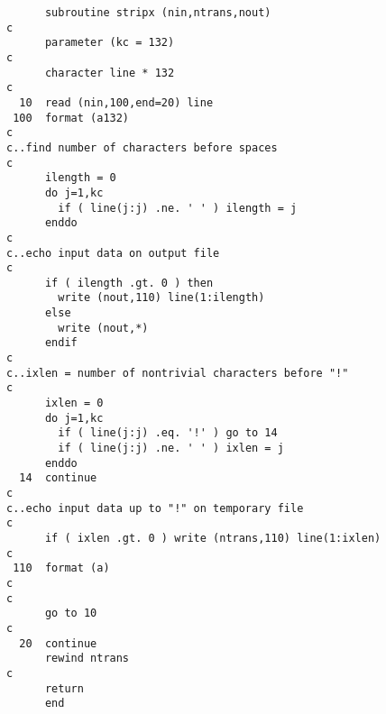 \begin{verbatim}
      subroutine stripx (nin,ntrans,nout)
c
      parameter (kc = 132)
c
      character line * 132
c
  10  read (nin,100,end=20) line
 100  format (a132)
c
c..find number of characters before spaces
c
      ilength = 0
      do j=1,kc
        if ( line(j:j) .ne. ' ' ) ilength = j
      enddo
c
c..echo input data on output file
c
      if ( ilength .gt. 0 ) then
        write (nout,110) line(1:ilength)
      else
        write (nout,*)
      endif
c
c..ixlen = number of nontrivial characters before "!"
c
      ixlen = 0
      do j=1,kc
        if ( line(j:j) .eq. '!' ) go to 14
        if ( line(j:j) .ne. ' ' ) ixlen = j
      enddo
  14  continue
c
c..echo input data up to "!" on temporary file
c
      if ( ixlen .gt. 0 ) write (ntrans,110) line(1:ixlen)
c
 110  format (a)
c
c
      go to 10
c
  20  continue
      rewind ntrans
c
      return
      end
\end{verbatim}


